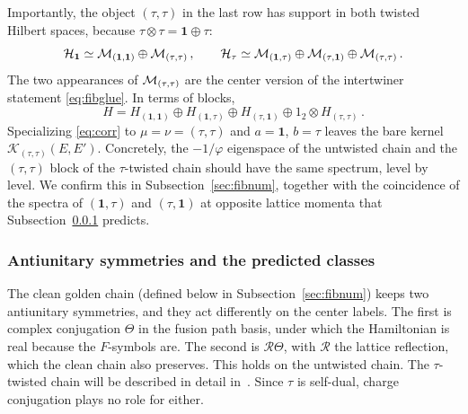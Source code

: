 \documentclass[11pt]{article}
\numberwithin{equation}{section}
\begin{document}
\noindent
Importantly, the object $(\tau,\tau)$ in the last row has support in both twisted Hilbert spaces,
because $\tau \otimes \tau = \mathbf 1 \oplus \tau$:
\begin{equation}
  \mathcal{H}_{\mathbf 1} \simeq \mathcal{M}_{(\mathbf 1,\mathbf 1)} \oplus \mathcal{M}_{(\tau,\tau)} \,,
  \qquad
  \mathcal{H}_\tau \simeq \mathcal{M}_{(\mathbf 1,\tau)} \oplus \mathcal{M}_{(\tau,\mathbf 1)} \oplus \mathcal{M}_{(\tau,\tau)} \,.
  \label{eq:fibdecomp}
\end{equation}
The two appearances of $\mathcal{M}_{(\tau,\tau)}$ are the center version of the intertwiner statement
\eqref{eq:fibglue}. In terms of blocks,
\begin{equation}
  H = H_{(\mathbf 1,\mathbf 1)} \oplus H_{(\mathbf 1,\tau)} \oplus H_{(\tau,\mathbf 1)} \oplus 1_2 \otimes H_{(\tau,\tau)} \,.
  \label{eq:fibblocks}
\end{equation}
Specializing \eqref{eq:corr} to $\mu = \nu = (\tau,\tau)$ and $a=\mathbf 1$, $b=\tau$ leaves the
bare kernel $\mathcal K_{(\tau,\tau)}(E,E')$. Concretely, the
$-1/\varphi$ eigenspace of the untwisted chain and the $(\tau,\tau)$ block of the $\tau$-twisted
chain should have the same spectrum, level by level. { We confirm this in Subsection~\ref{sec:fibnum}, together with the coincidence of the spectra of $(\mathbf 1,\tau)$ and $(\tau,\mathbf 1)$ at opposite lattice momenta that Subsection~\ref{sec:fibcrt} predicts.} 


\subsubsection{Antiunitary symmetries and the predicted classes}
\label{sec:fibcrt}

The clean golden chain (defined below in Subsection~\ref{sec:fibnum}) keeps two antiunitary symmetries, and they act
differently on the center labels. The first is complex conjugation $\Theta$ in the fusion path basis,
under which the Hamiltonian is real because the $F$-symbols are. The second is $\mathcal{R}\Theta$, with $\mathcal{R}$ the lattice reflection, which the clean chain also preserves. {This holds on the untwisted chain. The $\tau$-twisted chain will be described in detail in~\cite{Jensen:2026cat}.} Since $\tau$ is self-dual, charge
conjugation plays no role for either.
\end{document}
